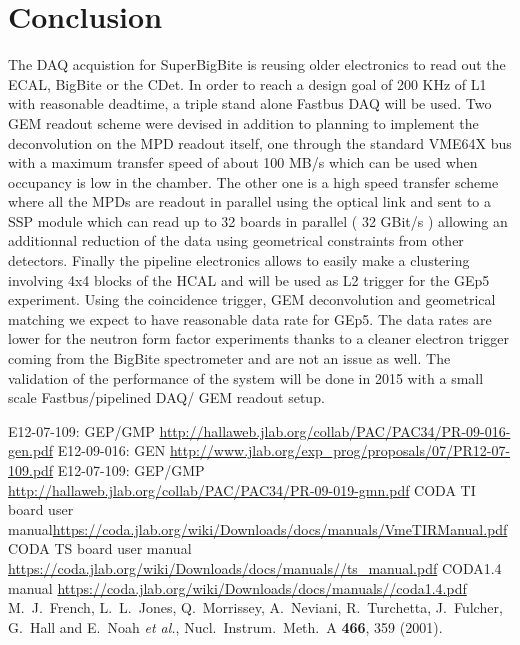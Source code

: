 \documentclass{article}
\begin{document}
\section{Conclusion}
The DAQ acquistion for SuperBigBite is reusing older electronics to read out the ECAL, BigBite or the CDet.
In order to reach a design goal of 200 KHz of L1 with reasonable deadtime, a triple stand alone 
Fastbus DAQ will be used. Two GEM readout scheme were devised in addition to planning to implement
the deconvolution on the MPD readout itself, one through the standard VME64X bus with a maximum
transfer speed of about 100 MB/s which can be used when occupancy is low in the chamber.
The other one is a high speed transfer scheme where all the MPDs are readout in parallel using the optical link
and sent to a SSP module which can read up to 32 boards in parallel ( 32 GBit/s ) allowing an additionnal reduction of the data using geometrical constraints from other detectors.
Finally the pipeline electronics allows to easily make a clustering involving 4x4 blocks of the HCAL and will be used as L2 trigger for the GEp5 experiment.
Using the coincidence trigger, GEM deconvolution and geometrical matching we expect to have reasonable data rate for GEp5. The data rates are lower for the neutron form factor experiments thanks to a cleaner electron trigger coming from the BigBite spectrometer and are not an issue as well. 
The validation of the performance of the system will be done in 2015 with a small scale Fastbus/pipelined DAQ/ GEM readout setup.

\begin{thebibliography}{9}
E12-07-109: GEP/GMP   \url{http://hallaweb.jlab.org/collab/PAC/PAC34/PR-09-016-gen.pdf}
E12-09-016: GEN \url{ http://www.jlab.org/exp_prog/proposals/07/PR12-07-109.pdf}
 E12-07-109: GEP/GMP \url{http://hallaweb.jlab.org/collab/PAC/PAC34/PR-09-019-gmn.pdf}
 CODA TI board user manual\url{https://coda.jlab.org/wiki/Downloads/docs/manuals/VmeTIRManual.pdf}
 CODA TS board user manual\url{ https://coda.jlab.org/wiki/Downloads/docs/manuals//ts_manual.pdf}
 CODA1.4 manual \url{https://coda.jlab.org/wiki/Downloads/docs/manuals//coda1.4.pdf}
  M.~J.~French, L.~L.~Jones, Q.~Morrissey, A.~Neviani, R.~Turchetta, J.~Fulcher, G.~Hall and E.~Noah {\it et al.},
  Nucl.\ Instrum.\ Meth.\ A {\bf 466}, 359 (2001).
\end{thebibliography}
\end{document}

